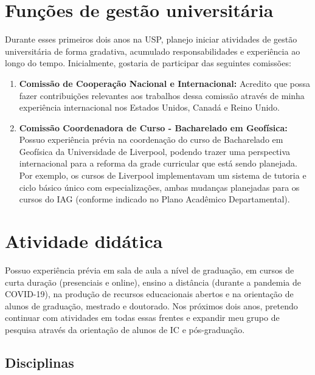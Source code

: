 \documentclass[12pt,a4paper,oneside]{book}
\begin{document}
\chapter{Funções de gestão universitária}

Durante esses primeiros dois anos na USP, planejo iniciar atividades de gestão
universitária de forma gradativa, acumulado responsabilidades e experiência ao
longo do tempo. Inicialmente, gostaria de participar das seguintes comissões:

\begin{enumerate}
  \item \textbf{Comissão de Cooperação Nacional e Internacional:} Acredito que
    possa fazer contribuições relevantes aos trabalhos dessa comissão através
    de minha experiência internacional nos Estados Unidos, Canadá e Reino
    Unido.
  \item \textbf{Comissão Coordenadora de Curso - Bacharelado em Geofísica:}
    Possuo experiência prévia na coordenação do curso de Bacharelado em
    Geofísica da Universidade de Liverpool, podendo trazer uma perspectiva
    internacional para a reforma da grade curricular que está sendo planejada.
    Por exemplo, os cursos de Liverpool implementavam um sistema de tutoria e
    ciclo básico único com especializações, ambas mudanças planejadas para os
    cursos do IAG (conforme indicado no Plano Acadêmico Departamental).
\end{enumerate}



\chapter{Atividade didática}

Possuo experiência prévia em sala de aula a nível de graduação, em cursos de
curta duração (presenciais e online), ensino a distância (durante a pandemia de
COVID-19), na produção de recursos educacionais abertos e na orientação de
alunos de graduação, mestrado e doutorado.
Nos próximos dois anos, pretendo continuar com atividades em todas essas
frentes e expandir meu grupo de pesquisa através da orientação de alunos de
IC e pós-graduação.

\section{Disciplinas}
\end{document}
